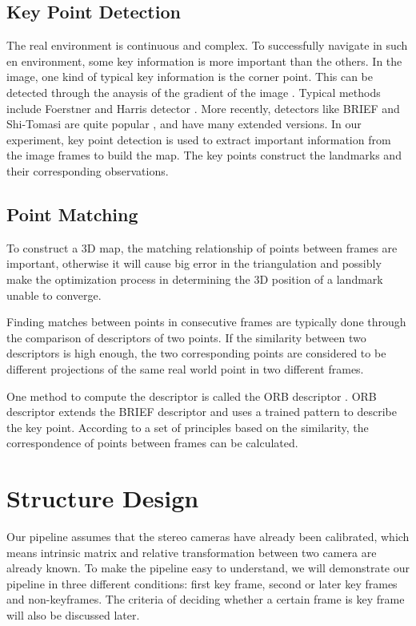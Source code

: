 \documentclass{easychair}
\begin{document}
\subsection{Key Point Detection}
The real environment is continuous and complex. To successfully navigate in such en environment, some key information is more important than the others. In the image, one kind of typical key information is the corner point. This can be detected through the anaysis of the gradient of the image \cite{gradient}. Typical methods include Foerstner and Harris detector \cite{detector}. More recently, detectors like BRIEF and Shi-Tomasi are quite popular \cite{brief} \cite{shitomasi}, and have many extended versions. In our experiment, key point detection is used to extract important information from the image frames to build the map. The key points construct the landmarks and their corresponding observations.

\subsection{Point Matching}
To construct a 3D map, the matching relationship of points between frames are important, otherwise it will cause big error in the triangulation and possibly make the optimization process in determining the 3D position of a landmark unable to converge.

Finding matches between points in consecutive frames are typically done through the comparison of descriptors of two points. If the similarity between two descriptors is high enough, the two corresponding points are considered to be different projections of the same real world point in two different frames. 

One method to compute the descriptor is called the ORB descriptor \cite{orb}. ORB descriptor extends the BRIEF descriptor \cite{brief} and uses a trained pattern to describe the key point. According to a set of principles based on the similarity, the correspondence of points between frames can be calculated.

\section{Structure Design}


Our pipeline assumes that the stereo cameras have already been calibrated, which means intrinsic matrix and relative transformation between two camera are already known. To make the pipeline easy to understand, we will demonstrate our pipeline in three different conditions: first key frame, second or later key frames and non-keyframes. The criteria of deciding whether a certain frame is key frame will also be discussed later.
\end{document}
